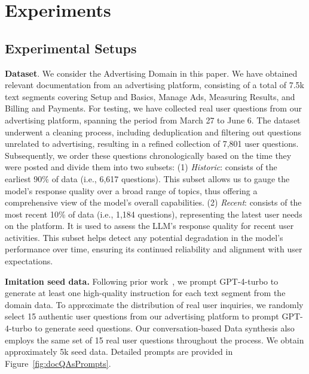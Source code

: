 \section{Experiments}
\subsection{Experimental Setups}
\label{sec:setups}
\textbf{Dataset}. We consider the Advertising Domain in this paper. We have obtained relevant documentation from an advertising platform, consisting of a total of 7.5k text segments covering Setup and Basics, Manage Ads, Measuring Results, and Billing and Payments. For testing, we have collected real user questions from our advertising platform, spanning the period from March 27 to June 6. The dataset underwent a cleaning process, including deduplication and filtering out questions unrelated to advertising, resulting in a refined collection of 7,801 user questions. Subsequently, we order these questions chronologically based on the time they were posted and divide them into two subsets: (1) \textit{Historic}: consists of the earliest 90\% of data (i.e., 6,617 questions). This subset allows us to gauge the model's response quality over a broad range of topics, thus offering a comprehensive view of the model's overall capabilities. (2) \textit{Recent}: consists of the most recent 10\% of data (i.e., 1,184 questions), representing the latest user needs on the platform. It is used to assess the LLM's response quality for recent user activities. This subset helps detect any potential degradation in the model's performance over time, ensuring its continued reliability and alignment with user expectations.


\textbf{Imitation seed data.} Following prior work~\cite{zhang2023self}, we prompt GPT-4-turbo to generate at least one high-quality instruction for each text segment from the domain data. To approximate the distribution of real user inquiries, we randomly select 15 authentic user questions from our advertising platform to prompt GPT-4-turbo to generate seed questions. Our conversation-based Data synthesis also employs the same set of 15 real user questions throughout the process. We obtain approximately 5k seed data. Detailed prompts are provided in Figure~\ref{fig:docQAsPrompts}. 

